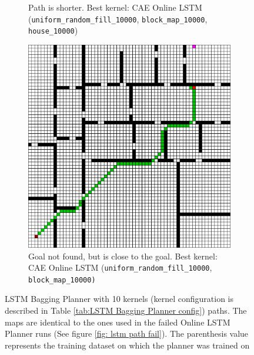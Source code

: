\begin{figure}[h!]
\begin{subfigure}[b]{0.33\linewidth}
     \caption{Path is shorter. Best kernel: CAE Online LSTM (\texttt{uniform\_random\_fill\_10000}, \texttt{block\_map\_10000}, \texttt{house\_10000})\newline}
  \end{subfigure}
  \hfill
  \begin{subfigure}[b]{0.33\linewidth}
    \includegraphics[width=\linewidth]{images/lstm_bagging_3.png}
     \caption{Goal not found, but is close to the goal. Best kernel: CAE Online LSTM (\texttt{uniform\_random\_fill\_10000}, \texttt{block\_map\_10000)}}
  \end{subfigure}
  \caption{LSTM Bagging Planner with 10 kernels (kernel configuration is described in Table \ref{tab:LSTM Bagging Planner config}) paths. The maps are identical to the ones used in the failed Online LSTM Planner runs (See figure \ref{fig: lstm path fail}). The parenthesis value represents the training dataset on which the planner was trained on}
  \label{fig: LSTM Bagging Planner runs}
\end{figure}

